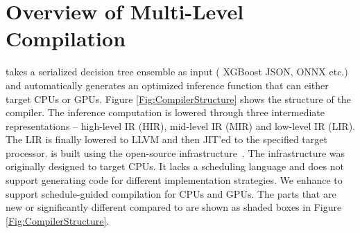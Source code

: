\section{Overview of \Treebeard{} Multi-Level Compilation}


\Treebeard{} takes a serialized decision tree ensemble as input (
XGBoost JSON, ONNX etc.) and automatically generates an optimized inference function
that can either target CPUs or GPUs. 
Figure \ref{Fig:CompilerStructure} shows the structure of the \Treebeard{} compiler. 
The inference computation is lowered through three intermediate representations
-- high-level IR (HIR), mid-level IR (MIR) and low-level IR (LIR). The LIR is
finally lowered to LLVM and then JIT'ed to the specified target processor. 
\Treebeard{} is built using the open-source \TreebeardOLD{} infrastructure~\cite{Treebeard}.
The \TreebeardOLD{} infrastructure was originally designed to target CPUs.
It lacks a scheduling language and does not support generating code for 
different implementation strategies. We enhance \TreebeardOLD{}  
to support schedule-guided compilation for CPUs and GPUs.
The parts \Treebeard{} that are new or significantly different compared to \TreebeardOLD{}
are shown as shaded boxes in Figure \ref{Fig:CompilerStructure}.

